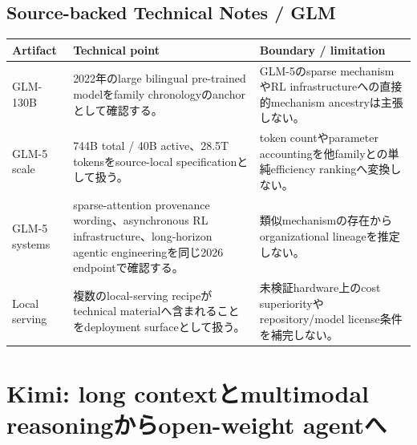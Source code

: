 \documentclass[lualatex,a4paper,10pt]{jlreq}
\begin{document}
\subsection*{Source-backed Technical Notes / GLM}
\small
\begin{tabularx}{\textwidth}{@{}>{\raggedright\arraybackslash}p{}>{\raggedright\arraybackslash}p{}>{\raggedright\arraybackslash}X@{}}
\toprule
Artifact & Technical point & Boundary / limitation \\
\midrule
GLM-130B & 2022年のlarge bilingual pre-trained modelをfamily chronologyのanchorとして確認する。 & GLM-5のsparse mechanismやRL infrastructureへの直接的mechanism ancestryは主張しない。 \\
GLM-5 scale & 744B total / 40B active、28.5T tokensをsource-local specificationとして扱う。 & token countやparameter accountingを他familyとの単純efficiency rankingへ変換しない。 \\
GLM-5 systems & sparse-attention provenance wording、asynchronous RL infrastructure、long-horizon agentic engineeringを同じ2026 endpointで確認する。 & 類似mechanismの存在からorganizational lineageを推定しない。 \\
Local serving & 複数のlocal-serving recipeがtechnical materialへ含まれることをdeployment surfaceとして扱う。 & 未検証hardware上のcost superiorityやrepository/model license条件を補完しない。 \\
\bottomrule
\end{tabularx}
\normalsize
\autocite{glm130b,glm5}

\section{Kimi: long contextとmultimodal reasoningからopen-weight agentへ}
\label{sec:kimi}
\end{document}
